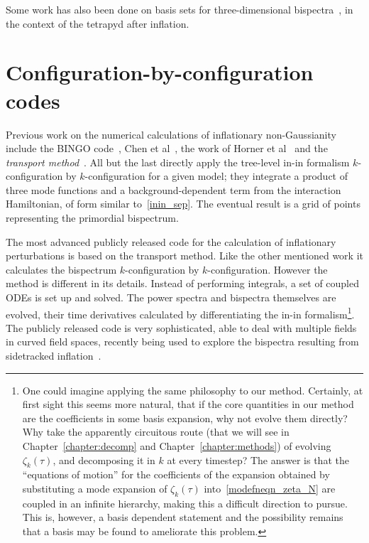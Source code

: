 Some work has also been done on basis sets for three-dimensional
bispectra~\cite{Byun_1, Byun_2, modal_battefeld}, in the context
of the tetrapyd after inflation.


    \section{Configuration-by-configuration codes}\label{sec:config_codes}
    Previous work on the numerical calculations of inflationary
non-Gaussianity include the BINGO code~\cite{BINGO},
Chen et al~\cite{chen_easther_lim_1,chen_easther_lim_2},
the work of Horner et al~\cite{horner_methods,horner_ng,horner_cs}
and the \textit{transport method}~\cite{transport_main,transport_pytransport,transport_pytransport_2,transport_curved_3_point}.
All but the last directly apply the tree-level in-in formalism $k$-configuration by $k$-configuration for a given model;
they integrate a product of three mode functions and a background-dependent term from the interaction Hamiltonian, of form similar to~\eqref{inin_sep}.
The eventual result is a grid of points representing the primordial bispectrum.


The most advanced publicly released code for the calculation of inflationary perturbations
is based on the transport method.
Like the other mentioned work it calculates the bispectrum $k$-configuration by $k$-configuration.
However the method is different in its details.
Instead of performing integrals,
a set of coupled ODEs is set up and solved.
The power spectra and bispectra themselves are evolved, their time derivatives calculated by
differentiating the in-in formalism\footnote{
    One could imagine applying the same philosophy to our method.
    Certainly, at first sight this seems more natural, that if the core
    quantities in our method are the coefficients in some basis expansion,
    why not evolve them directly? Why take the apparently circuitous route
    (that we will see in Chapter~\ref{chapter:decomp} and Chapter~\ref{chapter:methods})
    of evolving $\zeta_k(\tau)$, and decomposing it in $k$ at every timestep?
    The answer is that the ``equations of motion'' for the coefficients of the expansion
    obtained by substituting a mode expansion of $\zeta_k(\tau)$ into~\eqref{modefneqn_zeta_N}
    are coupled in an infinite hierarchy, making this a difficult
    direction to pursue. This is, however, a basis dependent statement
    and the possibility remains that a basis may be found to ameliorate this problem.
    }.
The publicly released code is very sophisticated,
able to deal with multiple fields in curved field spaces,
recently being used to explore the bispectra resulting from
sidetracked inflation~\cite{RP_1}.


